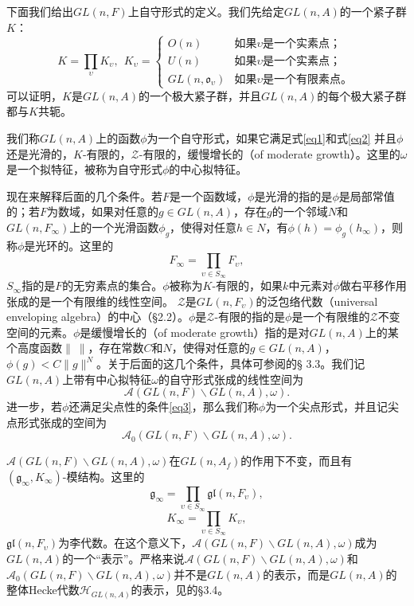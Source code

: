   下面我们给出$GL(n,F)$上自守形式的定义。我们先给定$GL(n,A)$的一个紧子群$K$：
  \[
  K = \prod\limits_{\upsilon} K_{\upsilon},\ \
  K_{\upsilon} = \left\{
  \begin{array}{lll}
  O(n) & \text{如果$\upsilon$是一个实素点；}\\
  U(n) & \text{如果$\upsilon$是一个实素点；}\\
  GL(n,\mathfrak{o}_{\upsilon}) & \text{如果$\upsilon$是一个有限素点。}
  \end{array}
  \right.
  \]
  可以证明，$K$是$GL(n,A)$的一个极大紧子群，并且$GL(n,A)$的每个极大紧子群都与$K$共轭。

  \begin{definition}
  我们称$GL(n,A)$上的函数$\phi$为一个自守形式，如果它满足式\ref{eq1}和式\ref{eq2}
  并且$\phi$还是光滑的，$K$-有限的，$\mathcal {Z}$-有限的，缓慢增长的（of moderate
  growth）。这里的$\omega$是一个拟特征，被称为自守形式$\phi$的中心拟特征。
  \end{definition}
  现在来解释后面的几个条件。若$F$是一个函数域，$\phi$是光滑的指的是$\phi$是局部常值的；若$F$为数域，如果对任意的$g\in
  GL(n,A)$，存在$g$的一个邻域$N$和$GL(n,F_{\infty})$上的一个光滑函数$\phi_g$，使得对任意$h\in
  N$，有$\phi(h) = \phi_g(h_{\infty})$，则称$\phi$是光环的。这里的
  $$F_{\infty} = \prod\limits_{\upsilon\in S_{\infty}} F_{\upsilon},$$
  $S_{\infty}$指的是$F$的无穷素点的集合。$\phi$被称为$K$-有限的，如果$k$中元素对$\phi$做右平移作用张成的是一个有限维的线性空间。
  $\mathcal {Z}$是$GL(n,F_{\upsilon})$的泛包络代数（universal enveloping
  algebra）的中心（\onlinecite{bump}\S 2.2）。$\phi$是$\mathcal {Z}$-有限的指的是$\phi$是一个有限维的$\mathcal
  {Z}$不变空间的元素。$\phi$是缓慢增长的（of moderate
  growth）指的是对$GL(n,A)$上的某个高度函数$\|\ \|$，存在常数$C$和$N$，使得对任意的$g\in
  GL(n,A)$，$\phi(g) < C\|g\|^N$。关于后面的这几个条件，具体可参阅的\S
  3.3。我们记$GL(n,A)$上带有中心拟特征$\omega$的自守形式张成的线性空间为
  $$\mathcal {A}(GL(n,F)\backslash GL(n,A),\omega).$$
  进一步，若$\phi$还满足尖点性的条件\ref{eq3}，那么我们称$\phi$为一个尖点形式，并且记尖点形式张成的空间为
  $$\mathcal {A}_0(GL(n,F)\backslash GL(n,A),\omega).$$

  $\mathcal {A}(GL(n,F)\backslash
  GL(n,A),\omega)$在$GL(n,A_f)$的作用下不变，而且有$(\mathfrak{g}_{\infty},
  K_{\infty})$-模结构。这里的
  $$\mathfrak{g}_{\infty} = \prod\limits_{\upsilon\in S_{\infty}}
  \mathfrak{g}\mathfrak{l}(n, F_{\upsilon}),$$
  $$K_{\infty} = \prod\limits_{\upsilon\in S_{\infty}} K_{\upsilon},$$
  $\mathfrak{g}\mathfrak{l}(n,
  F_{\upsilon})$为李代数。在这个意义下，$\mathcal {A}(GL(n,F)\backslash
  GL(n,A),\omega)$成为$GL(n,A)$的一个“表示”。严格来说$\mathcal {A}(GL(n,F)\backslash
  GL(n,A),\omega)$和$\mathcal {A}_0(GL(n,F)\backslash
  GL(n,A),\omega)$并不是$GL(n,A)$的表示，而是$GL(n,A)$的整体Hecke代数$\mathcal
  {H}_{GL(n,A)}$的表示，见\onlinecite{bump}的\S 3.4。

